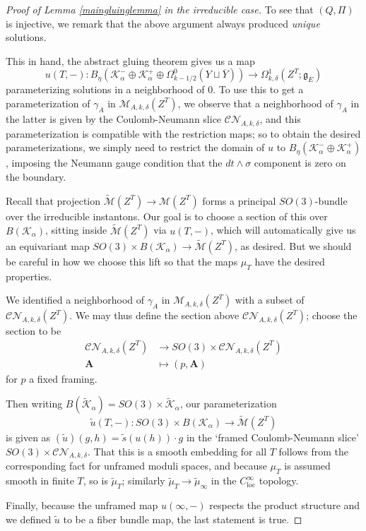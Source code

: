 \documentclass{memo-l}
\theoremstyle{definition}
\theoremstyle{remark}
\numberwithin{section}{chapter}
\numberwithin{equation}{chapter}
\begin{document}
\begin{proof}[Proof of Lemma \ref{maingluinglemma} in the irreducible case]
To see that $(Q, \Pi)$ is injective, we remark that the above argument always produced \emph{unique} solutions.

This in hand, the abstract gluing theorem gives us a map $$u(T, -): B_\eta\left(\mathcal K^-_\alpha \oplus \mathcal K^+_\alpha \oplus \Omega^0_{k-1/2}(Y \sqcup \overline Y)\right) \to \Omega^1_{k,\delta}(Z^T;\mathfrak g_E)$$ parameterizing solutions in a neighborhood of $0$. To use this to get a parameterization of $\gamma_A$ in $\mathcal M_{A,k,\delta}(Z^T)$, we observe that a neighborhood of $\gamma_A$ in the latter is given by the Coulomb-Neumann slice $\mathcal{CN}_{A,k,\delta}$, and this parameterization is compatible with the restriction maps; so to obtain the desired parameterizations, we simply need to restrict the domain of $u$ to $B_\eta(\mathcal K^-_\alpha \oplus \mathcal K^+_\alpha)$, imposing the Neumann gauge condition that the $dt \wedge \sigma$ component is zero on the boundary.

Recall that projection $\widetilde{\mathcal M}(Z^T) \to \mathcal M(Z^T)$ forms a principal $SO(3)$-bundle over the irreducible instantons. Our goal is to choose a section of this over $B(\mathcal K_\alpha)$, sitting inside $\widetilde{\mathcal M}(Z^T)$ via $u(T, -)$, which will automatically give us an equivariant map $SO(3) \times B(\mathcal K_\alpha) \to \widetilde{\mathcal M}(Z^T)$, as desired. But we should be careful in how we choose this lift so that the maps $\mu_T$ have the desired properties.

We identified a neighborhood of $\gamma_A$ in $\mathcal M_{A,k,\delta}(Z^T)$ with a subset of $\mathcal{CN}_{A,k,\delta}(Z^T)$. We may thus define the section above $\mathcal{CN}_{A,k,\delta}(Z^T)$; choose the section to be 
\begin{align*}\mathcal{CN}_{A,k,\delta}(Z^T) &\to SO(3) \times \mathcal{CN}_{A,k,\delta}(Z^T) \\
\mathbf{A} &\mapsto (p, \mathbf{A})
\end{align*}
for $p$ a fixed framing.

Then writing $B(\widetilde{\mathcal K}_\alpha) = SO(3) \times \widetilde{\mathcal K}_\alpha$, our parameterization $$\widetilde u(T,-): SO(3) \times B(\mathcal K_\alpha) \to \widetilde{\mathcal M}(Z^T)$$ is given as $(\tilde u)(g,h) = \tilde s(u(h)) \cdot g$ in the `framed Coulomb-Neumann slice' $SO(3) \times \mathcal{CN}_{A,k,\delta}$. That this is a smooth embedding for all $T$ follows from the corresponding fact for unframed moduli spaces, and because $\mu_T$ is assumed smooth in finite $T$, so is $\widetilde\mu_T$; similarly $\widetilde{\mu}_T \to \widetilde{\mu}_\infty$ in the $C^\infty_{\text{loc}}$ topology.

Finally, because the unframed map $u(\infty, -)$ respects the product structure and we defined $\tilde u$ to be a fiber bundle map, the last statement is true.
\end{proof}
\end{document}
